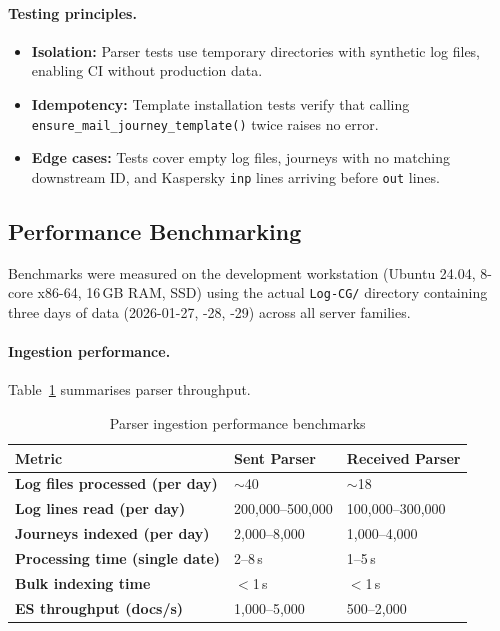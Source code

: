 \documentclass[12pt,a4paper,oneside]{report}
\newcommand{\rowA}{\rowcolor{rowgray}}
\begin{document}
\paragraph{Testing principles.}
\begin{itemize}
  \item \textbf{Isolation:} Parser tests use temporary directories with synthetic log files, enabling CI without production data.
  \item \textbf{Idempotency:} Template installation tests verify that calling \texttt{ensure\_mail\_journey\_template()} twice raises no error.
  \item \textbf{Edge cases:} Tests cover empty log files, journeys with no matching downstream ID, and Kaspersky \texttt{inp} lines arriving before \texttt{out} lines.
\end{itemize}

\subsection{Performance Benchmarking}

Benchmarks were measured on the development workstation (Ubuntu 24.04, 8-core x86-64, 16\,GB RAM, SSD) using the actual \texttt{Log-CG/} directory containing three days of data (2026-01-27, -28, -29) across all server families.

\paragraph{Ingestion performance.}
Table~\ref{tab:bench-ingest} summarises parser throughput.

\begin{table}[H]
\centering
\caption{Parser ingestion performance benchmarks}
\label{tab:bench-ingest}
\begin{tabularx}{\textwidth}{@{}>{\bfseries}p{5.2cm} p{3.2cm} p{3.2cm}@{}}
\toprule
Metric & Sent Parser & Received Parser \\
\midrule
\rowA Log files processed (per day) & $\sim$40 & $\sim$18 \\
Log lines read (per day) & 200,000--500,000 & 100,000--300,000 \\
\rowA Journeys indexed (per day) & 2,000--8,000 & 1,000--4,000 \\
Processing time (single date) & 2--8\,s & 1--5\,s \\
\rowA Bulk indexing time & $<$1\,s & $<$1\,s \\
ES throughput (docs/s) & 1,000--5,000 & 500--2,000 \\
\bottomrule
\end{tabularx}
\end{table}
\end{document}
